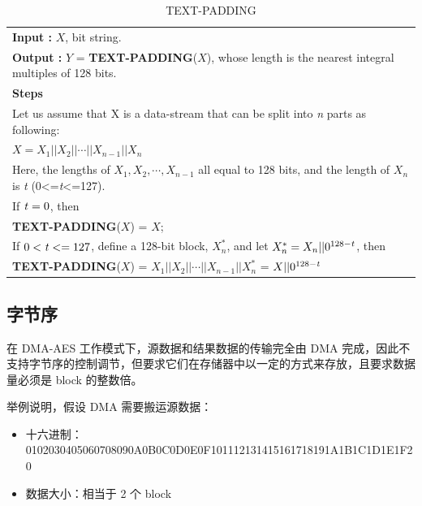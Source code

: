 \documentclass[main\_\_CN.tex]{subfiles}
\begin{document}
\begin{longtable}[c]{|p{15cm}|}
\caption{TEXT-PADDING} 
\label{tab:aes-define-func-text-padding}\\
\hline
\rowcolor{lightgray}
\multirow{1}{*}{%
{\bfseries Function :} {\bfseries TEXT-PADDING}(\ ) } \\\hline
{\bfseries Input\phantom{aaa} :} $X$, bit string.\\
{\bfseries Output\phantom{a~} :} $Y$ = {\bfseries TEXT-PADDING}($X$), whose length is the nearest integral multiples of 128 bits. \\\hline
{\bfseries Steps\phantom{aa~}  }\\
\hspace{1.3cm} Let us assume that X is a data-stream that can be split into {\it{n}} parts as following: \\
\phantom{aaaaaaaa}$X = X_{1} || X_{2} || \cdots || X_{n-1} || X_{n}$ \\ 
\phantom{aaaaaaaa}Here, the lengths of $X_{1}, X_{2}, \cdots, X_{n-1}$ all equal to 128 bits, and the length of $X_{n}$ is {\it{t}} (0<={\it{t}}<=127).\\
\phantom{aaaaaaaa}If ${\it{t}} = 0$, then\\
\phantom{aaaaaaaa}\phantom{空空空空空} {\bfseries TEXT-PADDING}($X$) = $X$;\\
\phantom{aaaaaaaa}If $0<{\it{t}} <= 127$, define a 128-bit block, $X_{n}^{*}$, and let $X_{n}^{*} = X_{n} || 0^{128-{\it{t}}}$, then\\
\phantom{aaaaaaaa}\phantom{空空空空空} {\bfseries TEXT-PADDING}($X$) = $X_{1} || X_{2} || \cdots || X_{n-1} || X_{n}^{*}$  = $X || 0^{128-{\it{t}}}$\\
\hline
\end{longtable}

    
\subsection{字节序}

在 DMA-AES 工作模式下，源数据和结果数据的传输完全由 DMA 完成，因此不支持字节序的控制调节，但要求它们在存储器中以一定的方式来存放，且要求数据量必须是 block 的整数倍。

举例说明，假设 DMA 需要搬运源数据：

\begin{itemize}
    \item 十六进制： 0102030405060708090A0B0C0D0E0F101112131415161718191A1B1C1D1E1F20
    \item 数据大小：相当于 2 个 block
\end{itemize}
\end{document}
